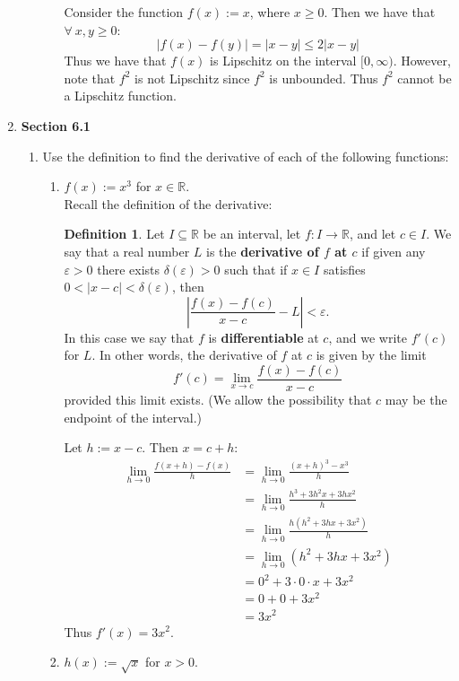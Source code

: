 \documentclass[12pt,letterpaper]{article}
\newcommand{\abs}[1]{\left\lvert #1 \right\rvert}
\newcommand{\R}{\mathbb{R}}
\theoremstyle{case}
\theoremstyle{definition}
\newtheorem{definition*}{Definition}
\begin{document}
\begin{enumerate}
\begin{enumerate}
\begin{enumerate}
				Consider the function $f(x):=x$, where $x \geq 0$. Then we have that $\forall\ x,y \geq 0$:
				\[|f(x)-f(y)|=|x-y| \leq 2|x-y|\]
				Thus we have that $f(x)$ is Lipschitz on the interval $[0, \infty)$. However, note that $f^2$ is not Lipschitz since $f^2$ is unbounded. Thus $f^2$ cannot be a Lipschitz function.
			\end{enumerate}
		\end{enumerate}
		\item \textbf{Section 6.1}
		\begin{enumerate}
			\item[1.] Use the definition to find the derivative of each of the following functions:
			\begin{enumerate}
				\item[(a)] $f(x):=x^3$ for $x \in \R$.\\
				
				Recall the definition of the derivative:
				\theoremstyle{definition}
				\begin{definition*}
					Let $I \subseteq \R$ be an interval, let $f:I \rightarrow \R$, and let $ c \in I$. We say that a real number $L$ is the \textbf{derivative of $f$ at $c$}  if given any $\varepsilon > 0$ there exists $\delta (\varepsilon) > 0$ such that if $x \in I$ satisfies $0 < |x-c|<\delta (\varepsilon)$, then
					\[\abs{\frac{f(x)-f(c)}{x-c}-L}<\varepsilon.\]
					In this case we say that $f$ is \textbf{differentiable} at $c$, and we write $f'(c)$ for $L$. In other words, the derivative of $f$ at $c$ is given by the limit
					\[f'(c) = \lim_{x\to c} \frac{f(x)-f(c)}{x-c}\]
					provided this limit exists. (We allow the possibility that $c$ may be the endpoint of the interval.)
				\end{definition*}
				Let $h:=x-c$. Then $x=c+h$:
				\begin{align*}
					\lim\limits_{h \to 0} \frac{f(x+h)-f(x)}{h} &= \lim\limits_{h \to 0} \frac{(x+h)^3-x^3}{h} \\
					&= \lim\limits_{h \to 0} \frac{h^3+3h^2x+3hx^2}{h} \\
					&=\lim\limits_{h \to 0} \frac{h(h^2+3hx+3x^2)}{h} \\
					&= \lim\limits_{h \to 0} (h^2+3hx+3x^2) \\
					&= 0^2 + 3 \cdot 0 \cdot x + 3x^2 \\
					&= 0+0+3x^2 \\
					&= 3x^2
				\end{align*}
				Thus $f'(x) = 3x^2$.\\
				\item[(c)] $h(x):=\sqrt{x}$ for $x>0$.\\
				

\end{enumerate}
\end{enumerate}
\end{enumerate}
\end{document}
